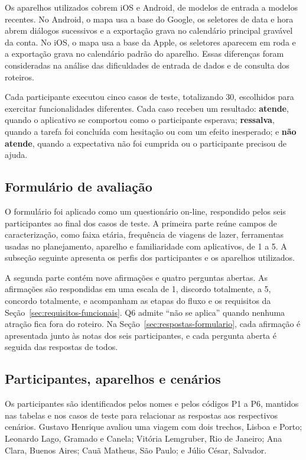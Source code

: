 Os aparelhos utilizados cobrem iOS e Android, de modelos de entrada a modelos recentes. No Android, o mapa usa a base do Google, os seletores de data e hora abrem diálogos sucessivos e a exportação grava no calendário principal gravável da conta. No iOS, o mapa usa a base da Apple, os seletores aparecem em roda e a exportação grava no calendário padrão do aparelho. Essas diferenças foram consideradas na análise das dificuldades de entrada de dados e de consulta dos roteiros.

Cada participante executou cinco casos de teste, totalizando 30, escolhidos para exercitar funcionalidades diferentes. Cada caso recebeu um resultado: \textbf{atende}, quando o aplicativo se comportou como o participante esperava; \textbf{ressalva}, quando a tarefa foi concluída com hesitação ou com um efeito inesperado; e \textbf{não atende}, quando a expectativa não foi cumprida ou o participante precisou de ajuda.

\FloatBarrier
{}
\subsection{Formulário de avaliação}

O formulário foi aplicado como um questionário on-line, respondido pelos seis participantes ao final dos casos de teste. A primeira parte reúne campos de caracterização, como faixa etária, frequência de viagens de lazer, ferramentas usadas no planejamento, aparelho e familiaridade com aplicativos, de 1 a 5. A subseção seguinte apresenta os perfis dos participantes e os aparelhos utilizados.

A segunda parte contém nove afirmações e quatro perguntas abertas. As afirmações são respondidas em uma escala de 1, discordo totalmente, a 5, concordo totalmente, e acompanham as etapas do fluxo e os requisitos da Seção~\ref{sec:requisitos-funcionais}. Q6 admite ``não se aplica'' quando nenhuma atração fica fora do roteiro. Na Seção~\ref{sec:respostas-formulario}, cada afirmação é apresentada junto às notas dos seis participantes, e cada pergunta aberta é seguida das respostas de todos.

\subsection{Participantes, aparelhos e cenários}

Os participantes são identificados pelos nomes e pelos códigos P1 a P6, mantidos nas tabelas e nos casos de teste para relacionar as respostas aos respectivos cenários. Gustavo Henrique avaliou uma viagem com dois trechos, Lisboa e Porto; Leonardo Lago, Gramado e Canela; Vitória Lemgruber, Rio de Janeiro; Ana Clara, Buenos Aires; Cauã Matheus, São Paulo; e Júlio César, Salvador.

